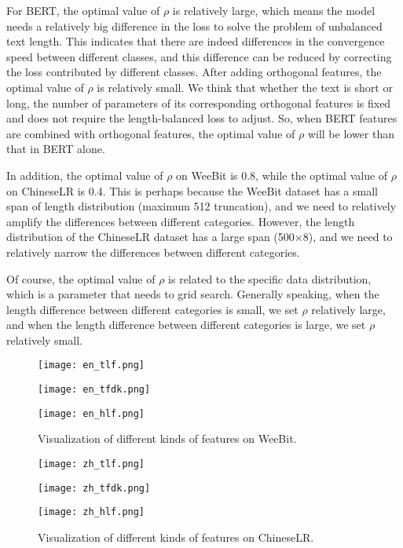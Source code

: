 \documentclass[11pt]{article}
\begin{document}
For BERT, the optimal value of $\rho$ is relatively large, which means the model needs a relatively big difference in the loss to solve the problem of unbalanced text length. This indicates that there are indeed differences in the convergence speed between different classes, and this difference can be reduced by correcting the loss contributed by different classes.
After adding orthogonal features, the optimal value of $\rho$ is relatively small. We think that whether the text is short or long, the number of parameters of its corresponding orthogonal features is fixed and does not require the length-balanced loss to adjust. So, when BERT features are combined with orthogonal features, the optimal value of $\rho$ will be lower than that in BERT alone.


In addition, the optimal value of $\rho$ on WeeBit is 0.8, while the optimal value of $\rho$ on ChineseLR is 0.4. This is perhaps because the WeeBit dataset has a small span of length distribution (maximum 512 truncation), and we need to relatively amplify the differences between different categories. However, the length distribution of the ChineseLR dataset has a large span (500×8), and we need to relatively narrow the differences between different categories.


Of course, the optimal value of $\rho$ is related to the specific data distribution, which is a parameter that needs to grid search.
Generally speaking, when the length difference between different categories is small, we set $\rho$ relatively large, and when the length difference between different categories is large, we set $\rho$ relatively small.




\begin{figure*}[!t]
\begin{minipage}[t]{0.33\linewidth}
\centering
\texttt{[image: en\_tlf.png]}
\end{minipage}
\begin{minipage}[t]{0.33\linewidth}
\centering
\texttt{[image: en\_tfdk.png]}
\end{minipage}
\begin{minipage}[t]{0.33\linewidth}
\centering
\texttt{[image: en\_hlf.png]}
\end{minipage}
\caption{Visualization of different kinds of features on WeeBit.}
\end{figure*}



\begin{figure*}[!t]
\begin{minipage}[t]{0.33\linewidth}
\centering
\texttt{[image: zh\_tlf.png]}
\end{minipage}
\begin{minipage}[t]{0.33\linewidth}
\centering
\texttt{[image: zh\_tfdk.png]}
\end{minipage}
\begin{minipage}[t]{0.33\linewidth}
\centering
\texttt{[image: zh\_hlf.png]}
\end{minipage}
\caption{Visualization of different kinds of features on ChineseLR.}
\end{figure*}
\end{document}
